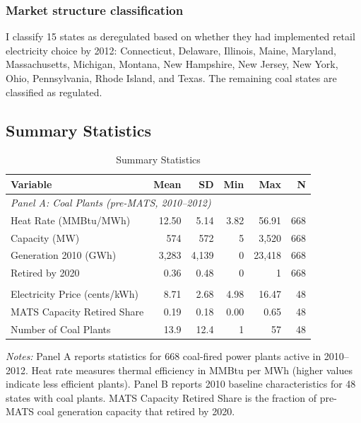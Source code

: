 \documentclass[12pt]{article}
\begin{document}
\subsubsection*{Market structure classification} I classify 15 states as deregulated based on whether they had implemented retail electricity choice by 2012: Connecticut, Delaware, Illinois, Maine, Maryland, Massachusetts, Michigan, Montana, New Hampshire, New Jersey, New York, Ohio, Pennsylvania, Rhode Island, and Texas. The remaining coal states are classified as regulated.

\subsection{Summary Statistics}

\begin{table}[H]
\centering
\caption{Summary Statistics}
\begin{threeparttable}
\begin{tabular}{lrrrrr}
\toprule
Variable & Mean & SD & Min & Max & N \\
\midrule
\multicolumn{6}{l}{\textit{Panel A: Coal Plants (pre-MATS, 2010--2012)}} \\
\addlinespace
Heat Rate (MMBtu/MWh) & 12.50 & 5.14 & 3.82 & 56.91 & 668 \\
Capacity (MW) & 574 & 572 & 5 & 3,520 & 668 \\
Generation 2010 (GWh) & 3,283 & 4,139 & 0 & 23,418 & 668 \\
Retired by 2020 & 0.36 & 0.48 & 0 & 1 & 668 \\
\addlinespace
\multicolumn{6}{l}{\textit{Panel B: States with Coal Plants (2010 baseline)}} \\
\addlinespace
Electricity Price (cents/kWh) & 8.71 & 2.68 & 4.98 & 16.47 & 48 \\
MATS Capacity Retired Share & 0.19 & 0.18 & 0.00 & 0.65 & 48 \\
Number of Coal Plants & 13.9 & 12.4 & 1 & 57 & 48 \\
\bottomrule
\end{tabular}
\begin{tablenotes}[flushleft]
\small
\item \textit{Notes:} Panel A reports statistics for 668 coal-fired power plants active in 2010--2012. Heat rate measures thermal efficiency in MMBtu per MWh (higher values indicate less efficient plants). Panel B reports 2010 baseline characteristics for 48 states with coal plants. MATS Capacity Retired Share is the fraction of pre-MATS coal generation capacity that retired by 2020.
\end{tablenotes}
\end{threeparttable}
\label{tab:summary}
\end{table}
\end{document}

